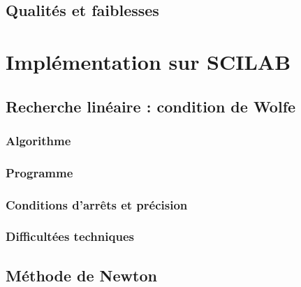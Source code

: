 \documentclass[3p, twocolumn]{elsarticle}
\begin{document}
\subsection{Qualités et faiblesses}
\section{Implémentation sur SCILAB}
\subsection{Recherche linéaire : condition de Wolfe}
\subsubsection{Algorithme}
\subsubsection{Programme}
\subsubsection{Conditions d'arrêts et précision}
\subsubsection{Difficultées techniques}
\subsection{Méthode de Newton}
\end{document}
